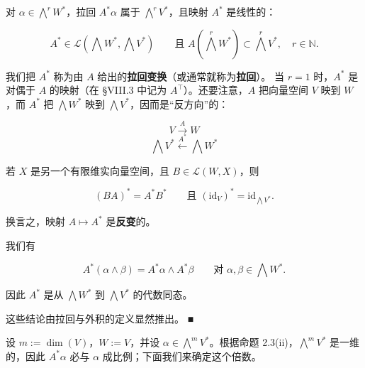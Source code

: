 \begin{remark}

\begin{items}
\item

对 $ \alpha \in \bigwedge^{r}W^{*} $，拉回 $ A^{*}\alpha $ 属于 $ \bigwedge^{r}V^{*} $，且映射 $ A^{*} $ 是线性的：

\[
A^{*} \in \mathcal{L}(\bigwedge W^{*}, \bigwedge V^{*}) \qquad \text{且 } A(\bigwedge^{r}W^{*}) \subset \bigwedge^{r}V^{*} , \quad r \in \mathbb{N} .
\]

我们把 $ A^{*} $ 称为由 $ A $ 给出的\textbf{拉回变换}（或通常就称为\textbf{拉回}）。
当 $ r = 1 $ 时，$ A^{*} $ 是对偶于 $ A $ 的映射（在 §VIII.3 中记为 $ A^{\top} $）。还要注意，$ A $ 把向量空间 $ V $ 映到 $ W $，而 $ A^{*} $ 把 $ \bigwedge W^{*} $ 映到 $ \bigwedge V^{*} $，因而是“反方向”的：

\[
V \xrightarrow{A} W
\]
\[
\bigwedge V^{*} \xleftarrow{A^{*}} \bigwedge W^{*}
\]
\item

若 $ X $ 是另一个有限维实向量空间，且 $ B \in \mathcal{L}(W,X) $，则

\[
(BA)^{*} = A^{*}B^{*} \qquad \text{且 } (\mathrm{id}_{V})^{*} = \mathrm{id}_{\bigwedge V^{*}} .
\]

换言之，映射 $ A \mapsto A^{*} $ 是\textbf{反变}的。

\item

我们有

\[
A^{*}(\alpha \wedge \beta) = A^{*}\alpha \wedge A^{*}\beta \qquad \text{对 } \alpha,\beta \in \bigwedge W^{*} .
\]

因此 $ A^{*} $ 是从 $ \bigwedge W^{*} $ 到 $ \bigwedge V^{*} $ 的代数同态。

\proofhead
这些结论由拉回与外积的定义显然推出。 \nobreak\hspace{0.35em}■
\end{items}

设 $ m := \dim(V) $，$ W := V $，并设 $ \alpha \in \bigwedge^{m}V^{*} $。根据命题 2.3(ii)，$ \bigwedge^{m}V^{*} $ 是一维的，因此 $ A^{*}\alpha $ 必与 $ \alpha $ 成比例；下面我们来确定这个倍数。

\end{remark}

